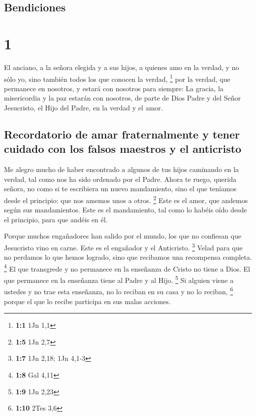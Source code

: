 \hypertarget{bendiciones}{%
\subsection{Bendiciones}\label{bendiciones}}

\hypertarget{section}{%
\section{1}\label{section}}

 El anciano, a la señora elegida y a sus hijos, a quienes
amo en la verdad, y no sólo yo, sino también todos los que conocen la
verdad, \footnote{\textbf{1:1} 1Jn 1,1}  por la verdad,
que permanece en nosotros, y estará con nosotros para siempre:
 La gracia, la misericordia y la paz estarán con nosotros,
de parte de Dios Padre y del Señor Jesucristo, el Hijo del Padre, en la
verdad y el amor.

\hypertarget{recordatorio-de-amar-fraternalmente-y-tener-cuidado-con-los-falsos-maestros-y-el-anticristo}{%
\subsection{Recordatorio de amar fraternalmente y tener cuidado con los
falsos maestros y el
anticristo}\label{recordatorio-de-amar-fraternalmente-y-tener-cuidado-con-los-falsos-maestros-y-el-anticristo}}

 Me alegro mucho de haber encontrado a algunos de tus
hijos caminando en la verdad, tal como nos ha sido ordenado por el
Padre.  Ahora te ruego, querida señora, no como si te
escribiera un nuevo mandamiento, sino el que teníamos desde el
principio: que nos amemos unos a otros. \footnote{\textbf{1:5} 1Jn 2,7}
 Este es el amor, que andemos según sus mandamientos. Este
es el mandamiento, tal como lo habéis oído desde el principio, para que
andéis en él.

 Porque muchos engañadores han salido por el mundo, los
que no confiesan que Jesucristo vino en carne. Este es el engañador y el
Anticristo. \footnote{\textbf{1:7} 1Jn 2,18; 1Jn 4,1-3} 
Velad para que no perdamos lo que hemos logrado, sino que recibamos una
recompensa completa. \footnote{\textbf{1:8} Gal 4,11}  El
que transgrede y no permanece en la enseñanza de Cristo no tiene a Dios.
El que permanece en la enseñanza tiene al Padre y al Hijo. \footnote{\textbf{1:9}
  1Jn 2,23}  Si alguien viene a ustedes y no trae esta
enseñanza, no lo reciban en su casa y no lo reciban, \footnote{\textbf{1:10}
  2Tes 3,6}  porque el que lo recibe participa en sus
malas acciones.

